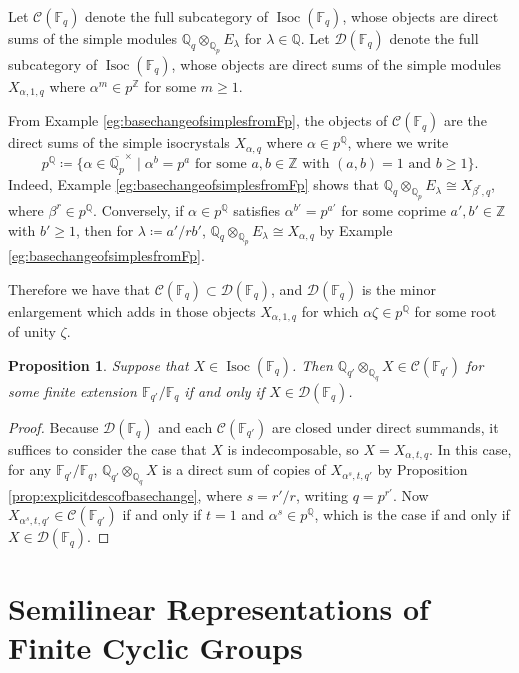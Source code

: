 \documentclass[10pt, reqno, hidelinks]{amsart}
\DeclareMathOperator{\Isoc}{Isoc}
\newcommand{\bF}{{\mathbb F}}
\newcommand{\bQ}{{\mathbb Q}}
\newcommand{\bZ}{{\mathbb Z}}
\newcommand{\sC}{{\mathcal C}}
\newcommand{\sD}{{\mathcal D}}
\numberwithin{thm}{subsection}
\newtheorem{prop}[thm]{Proposition}
\theoremstyle{definition}
\begin{document}
Let $\sC(\bF_q)$ denote the full subcategory of $\Isoc(\bF_q)$, whose objects are direct sums of the simple modules $\bQ_q \otimes_{\bQ_p} E_{\lambda}$ for $\lambda \in \bQ$. Let $\sD(\bF_q)$ denote the full subcategory of $\Isoc(\bF_q)$, whose objects are direct sums of the simple modules $X_{\alpha, 1, q}$ where $\alpha^m \in p^{\bZ}$ for some $m \geq 1$.

From Example \ref{eg:basechangeofsimplesfromFp}, the objects of $\sC(\bF_q)$ are the direct sums of the simple isocrystals $X_{\alpha, q}$ where $\alpha \in p^{\bQ}$, where we write 
\[
p^{\bQ} \coloneqq \{\alpha \in \overline{\bQ_p}^{\times} \mid \alpha^b = p^a \text{ for some } a, b \in \bZ \text{ with } (a,b) = 1 \text{ and } b \geq 1\}. 
\]
Indeed, Example \ref{eg:basechangeofsimplesfromFp} shows that $\bQ_q \otimes_{\bQ_p} E_{\lambda} \cong X_{\beta^r, q}$, where $\beta^r \in p^{\bQ}$. Conversely, if $\alpha \in p^{\bQ}$ satisfies $\alpha^{b'} = p^{a'}$ for some coprime $a', b' \in \bZ$ with $b' \geq 1$, then for $\lambda \coloneqq a' / r b'$, $\bQ_q \otimes_{\bQ_p} E_{\lambda} \cong X_{\alpha, q}$ by Example \ref{eg:basechangeofsimplesfromFp}.

Therefore we have that $\sC(\bF_q) \subset \sD(\bF_q)$, and $\sD(\bF_q)$ is the minor enlargement which adds in those objects $X_{\alpha, 1, q}$ for which $\alpha \zeta \in p^{\bQ}$ for some root of unity $\zeta$.

\begin{prop}
	Suppose that $X \in \Isoc(\bF_q)$. Then $\bQ_{q'} \otimes_{\bQ_q} X \in \sC(\bF_{q'})$ for some finite extension $\bF_{q'} / \bF_q$ if and only if $X \in \sD(\bF_q)$.
\end{prop}

\begin{proof}
	Because $\sD(\bF_q)$ and each $\sC(\bF_{q'})$ are closed under direct summands, it suffices to consider the case that $X$ is indecomposable, so $X = X_{\alpha, t, q}$. In this case, for any $\bF_{q'} / \bF_q$, $\bQ_{q'} \otimes_{\bQ_q} X$ is a direct sum of copies of $X_{\alpha^s, t, q'}$ by Proposition \ref{prop:explicitdescofbasechange}, where $s = r' / r$, writing $q = p^{r'}$. Now $X_{\alpha^s, t, q'} \in \sC(\bF_{q'})$ if and only if $t = 1$ and $\alpha^s \in p^{\bQ}$, which is the case if and only if $X \in \sD(\bF_q)$.
\end{proof}

\section{Semilinear Representations of Finite Cyclic Groups}\label{sect:cyclicgroups}
\end{document}
